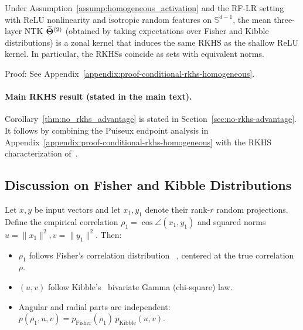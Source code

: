 \begin{corollary}\label{cor:conditional_rkhs_homogeneous}
Under Assumption~\ref{assump:homogeneous_activation} and the RF-LR setting with ReLU nonlinearity and isotropic random features on \(\mathbb{S}^{d-1}\), the mean three-layer NTK \(\widetilde{\boldsymbol{\Theta}}^{(2)}\) (obtained by taking expectations over Fisher and Kibble distributions) is a zonal kernel that induces the same RKHS as the shallow ReLU kernel. In particular, the RKHSs coincide as sets with equivalent norms.
\end{corollary}
Proof: See Appendix~\ref{appendix:proof-conditional-rkhs-homogeneous}.

\paragraph{Main RKHS result (stated in the main text).}
Corollary~\ref{thm:no_rkhs_advantage} is stated in Section~\ref{sec:no-rkhs-advantage}. It follows by combining the Puiseux endpoint analysis in Appendix~\ref{appendix:proof-conditional-rkhs-homogeneous} with the RKHS characterization of~\cite{bietti2021deepequalsshallowrelu}.




\subsection{Discussion on Fisher and Kibble Distributions}
\label{appendix:fisher-kibble}

\begin{lemma}
\label{lem:fisher-kibble-appendix}
Let \(x,y\) be input vectors and let \(x_1,y_1\) denote their rank-\(r\) random projections. Define the empirical correlation \( \rho_1 = \cos\angle(x_1,y_1) \) and squared norms \( u=\|x_1\|^2, v=\|y_1\|^2 \). Then:
\begin{itemize}
    \item \( \rho_1 \) follows Fisher's correlation distribution~\cite{fisher1915probable} \cite{hotelling1953new}, centered at the true correlation \( \rho \).
    \item \( (u,v) \) follow Kibble's~\cite{kibble1941two} bivariate Gamma (chi-square) law.
    \item Angular and radial parts are independent: \( p(\rho_1,u,v) = p_{\text{Fisher}}(\rho_1)\,p_{\text{Kibble}}(u,v) \).
\end{itemize}
\end{lemma}

